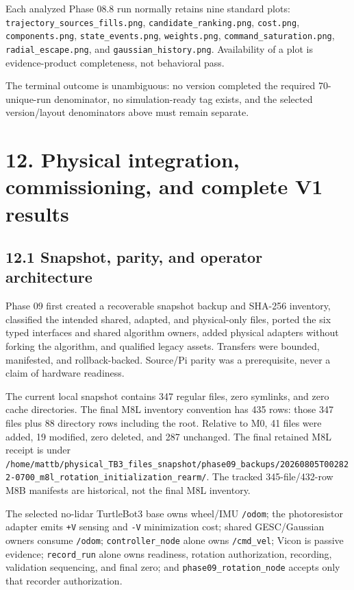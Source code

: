 \documentclass[
  10pt,
  letterpaper,
]{article}
\begin{document}
Each analyzed Phase 08.8 run normally retains nine standard plots:
\nolinkurl{trajectory\_sources\_fills.png}, \nolinkurl{candidate\_ranking.png}, \nolinkurl{cost.png},
\nolinkurl{components.png}, \nolinkurl{state\_events.png}, \nolinkurl{weights.png},
\nolinkurl{command\_saturation.png}, \nolinkurl{radial\_escape.png}, and \nolinkurl{gaussian\_history.png}.
Availability of a plot is evidence-product completeness, not behavioral pass.

The terminal outcome is unambiguous: no version completed the required
70-unique-run denominator, no simulation-ready tag exists, and the selected
version/layout denominators above must remain separate.

\section{12. Physical integration, commissioning, and complete V1 results}\label{physical-integration-commissioning-and-complete-v1-results}

\subsection{12.1 Snapshot, parity, and operator architecture}\label{snapshot-parity-and-operator-architecture}

Phase 09 first created a recoverable snapshot backup and SHA-256 inventory,
classified the intended shared, adapted, and physical-only files, ported the six
typed interfaces and shared algorithm owners, added physical adapters without
forking the algorithm, and qualified legacy assets. Transfers were bounded,
manifested, and rollback-backed. Source/Pi parity was a prerequisite, never a
claim of hardware readiness.

The current local snapshot contains 347 regular files, zero symlinks, and zero
cache directories. The final M8L inventory convention has 435 rows: those 347
files plus 88 directory rows including the root. Relative to M0, 41 files were
added, 19 modified, zero deleted, and 287 unchanged. The final retained M8L
receipt is under
\nolinkurl{/home/mattb/physical\_TB3\_files\_snapshot/phase09\_backups/20260805T002822-0700\_m8l\_rotation\_initialization\_rearm/}.
The tracked 345-file/432-row M8B manifests are historical, not the final M8L
inventory.

The selected no-lidar TurtleBot3 base owns wheel/IMU \nolinkurl{/odom}; the photoresistor
adapter emits \nolinkurl{+V} sensing and \nolinkurl{-V} minimization cost; shared GESC/Gaussian
owners consume \nolinkurl{/odom}; \nolinkurl{controller\_node} alone owns \nolinkurl{/cmd\_vel}; Vicon is
passive evidence; \nolinkurl{record\_run} alone owns readiness, rotation authorization,
recording, validation sequencing, and final zero; and
\nolinkurl{phase09\_rotation\_node} accepts only that recorder authorization.
\end{document}

